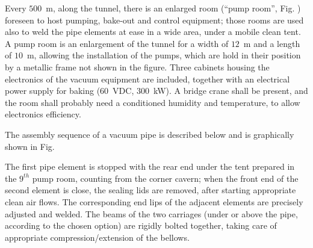 
Every $500$~m, along the tunnel, there is an enlarged room (``pump room'', Fig.%
) foreseen to host pumping, bake-out and control equipment; those rooms are used also to weld the pipe elements at ease in a wide area, under a mobile clean tent. A pump room is an enlargement of the tunnel for a width of $12$~m and a length of $10$~m, allowing the installation of the pumps, which are hold in their position by a metallic frame not shown in the figure. Three cabinets housing the electronics of the vacuum equipment are included, together with an electrical power supply for baking ($60$~VDC, $300$~kW). A bridge crane shall be present, and the room shall probably need a conditioned humidity and temperature, to allow electronics efficiency. 

The assembly sequence of a vacuum pipe is described below and is graphically shown in Fig. %

The first pipe element is stopped with the rear end under the tent prepared in the $9^{th}$ pump room, counting from the corner cavern; when the front end of the second element is close, the sealing lids are removed, after starting appropriate clean air flows. The corresponding end lips of the adjacent elements are precisely adjusted and welded. The beams of the two carriages (under or above the pipe, according to the chosen option) are rigidly bolted together, taking care of appropriate compression/extension of the bellows. 

